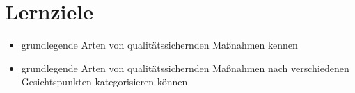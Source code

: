 \section{Lernziele}

\begin{itemize}
    \item grundlegende Arten von qualitätssichernden Maßnahmen kennen
    \item grundlegende Arten von qualitätssichernden Maßnahmen nach verschiedenen Gesichtspunkten kategorisieren können
\end{itemize}
